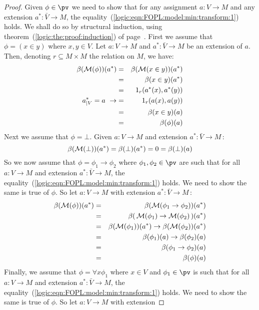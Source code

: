 \begin{proof}
Given $\phi\in\pv$ we need to show that for any assignment $a:V\to
M$ and any extension $a^{*}:\bar{V}\to M$, the
equality~(\ref{logic:eqn:FOPL:model:min:transform:1}) holds. We
shall do so by structural induction, using
theorem~(\ref{logic:the:proof:induction}) of
page~\pageref{logic:the:proof:induction}. First we assume that
$\phi=(x\in y)$ where $x,y\in V$. Let $a:V\to M$ and
$a^{*}:\bar{V}\to M$ be an extension of $a$. Then, denoting
$r\subseteq M\times M$ the relation on $M$, we have:
    \begin{eqnarray*}
    \beta({\cal M}(\phi))(a^{*})&=&\beta({\cal M}(x\in y))(a^{*})\\
    &=&\beta(x\in y)(a^{*})\\
    &=&1_{r}(a^{*}(x),a^{*}(y))\\
    a^{*}_{|V}=a\ \rightarrow&=&1_{r}(a(x),a(y))\\
    &=&\beta(x\in y)(a)\\
    &=&\beta(\phi)(a)\\
    \end{eqnarray*}
Next we assume that $\phi=\bot$. Given $a:V\to M$ and extension
$a^{*}:\bar{V}\to M$\,:
    \[
    \beta({\cal M}(\bot))(a^{*})=\beta(\bot)(a^{*})=0=\beta(\bot)(a)
    \]
So we now assume that $\phi=\phi_{1}\to\phi_{2}$ where
$\phi_{1},\phi_{2}\in\pv$ are such that for all $a:V\to M$ and
extension $a^{*}:\bar{V}\to M$, the
equality~(\ref{logic:eqn:FOPL:model:min:transform:1}) holds. We need
to show the same is true of $\phi$. So let $a:V\to M$ with extension
$a^{*}:\bar{V}\to M$\,:
    \begin{eqnarray*}
    \beta({\cal M}(\phi))(a^{*})&=&\beta({\cal M}(\phi_{1}\to\phi_{2}))(a^{*})\\
    &=&\beta(\,{\cal M}(\phi_{1})\to{\cal M}(\phi_{2})\,)(a^{*})\\
    &=&\beta({\cal M}(\phi_{1}))(a^{*})\to\beta({\cal M}(\phi_{2}))(a^{*})\\
    &=&\beta(\phi_{1})(a)\to\beta(\phi_{2})(a)\\
    &=&\beta(\phi_{1}\to\phi_{2})(a)\\
    &=&\beta(\phi)(a)\\
    \end{eqnarray*}
Finally, we assume that $\phi=\forall x\phi_{1}$ where $x\in V$ and
$\phi_{1}\in\pv$ is such that for all $a:V\to M$ and extension
$a^{*}:\bar{V}\to M$, the
equality~(\ref{logic:eqn:FOPL:model:min:transform:1}) holds. We need
to show the same is true of $\phi$. So let $a:V\to M$ with extension

\end{proof}
